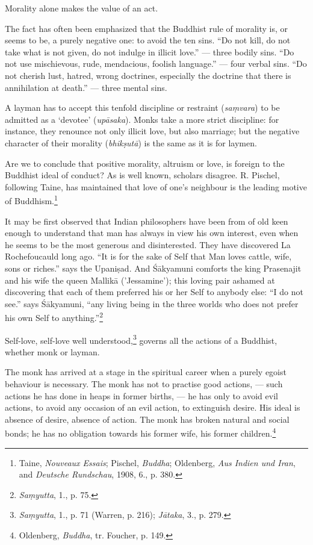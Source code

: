 \documentclass[a4paper, 11pt, oneside, english, landscape]{article}
\begin{document}
Morality alone makes the value of an act.

The fact has often been emphasized that the Buddhist rule of morality is, or seems to be, a purely negative one: to avoid the ten sins. ``Do not kill, do not take what is not given, do not indulge in illicit love.'' --- three bodily sins. ``Do not use mischievous, rude, mendacious, foolish language.'' --- four verbal sins. ``Do not cherish lust, hatred, wrong doctrines, especially the doctrine that there is annihilation at death.'' --- three mental sins.

A layman has to accept this tenfold discipline or restraint (\emph{saṃvara}) to be admitted as a `devotee' (\emph{upāsaka}). Monks take a more strict discipline: for instance, they renounce not only illicit love, but also marriage; but the negative character of their morality (\emph{bhikṣutā}) is the same as it is for laymen.

Are we to conclude that positive morality, altruism or love, is foreign to the Buddhist ideal of conduct? As is well known, scholars disagree. R. Pischel, following Taine, has maintained that love of one's neighbour is the leading motive of Buddhism.\footnote{Taine, \emph{Nouveaux Essais}; Pischel, \emph{Buddha}; Oldenberg, \emph{Aus Indien und Iran}, and \emph{Deutsche Rundschau}, 1908, 6., p. 380.}

It may be first observed that Indian philosophers have been from of old keen enough to understand that man has always in view his own interest, even when he seems to be the most generous and disinterested. They have discovered La Rochefoucauld long ago. ``It is for the sake of Self that Man loves cattle, wife, sons or riches.'' says the Upaniṣad. And Śākyamuni comforts the king Prasenajit and his wife the queen Mallikā ('Jessamine'); this loving pair ashamed at discovering that each of them preferred his or her Self to anybody else: ``I do not see.'' says Śākyamuni, ``any living being in the three worlds who does not prefer his own Self to anything.''\footnote{\emph{Saṃyutta}, 1., p. 75.}

Self-love, self-love well understood,\footnote{\emph{Saṃyutta}, 1., p. 71 (Warren, p. 216); \emph{Jātaka}, 3., p. 279.} governs all the actions of a Buddhist, whether monk or layman.

The monk has arrived at a stage in the spiritual career when a purely egoist behaviour is necessary. The monk has not to practise good actions, --- such actions he has done in heaps in former births, --- he has only to avoid evil actions, to avoid any occasion of an evil action, to extinguish desire. His ideal is absence of desire, absence of action. The monk has broken natural and social bonds; he has no obligation towards his former wife, his former children.\footnote{Oldenberg, \emph{Buddha}, tr. Foucher, p. 149.}
\end{document}
